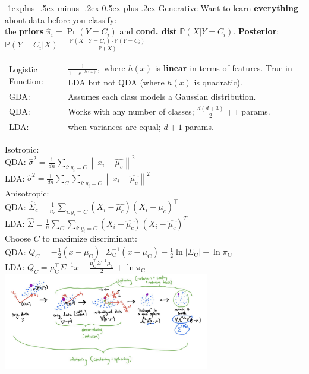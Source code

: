 \documentclass[10pt,landscape]{article}
\makeatletter
\renewcommand{\subsection}{\@startsection{subsection}{2}{0mm}%
                                {-1explus -.5ex minus -.2ex}%
                                {0.5ex plus .2ex}%
                                {\normalfont\normalsize\bfseries}}
\makeatother
\begin{document}
\begin{multicols}{3}
\subsection{Generative}
Want to learn \textbf{everything} about data before you classify: \\
the \textbf{priors} $\hat\pi_i=\Pr(Y=C_i)$ and \textbf{cond. dist} $\mathbb{P}(X|Y=C_i)$.
\textbf{Posterior}: $\mathbb{P}(Y=C_i | X) = \frac{\mathbb{P}(X \mid Y = C_i) \cdot \mathbb{P}(Y=C_i)}{\mathbb{P}(X)}$ 
\begin{tabular}{@{}p{\the\MyLen}%
                @{}p{\linewidth-\the\MyLen}@{}}
Logistic Function: & $\frac{1}{1 + e^{-h(x)}}, $ where $h(x)$ is \textbf{linear} in terms of features. True in LDA but not QDA (where $h(x)$ is quadratic).\\
GDA: & Assumes each class models a Gaussian distribution. \\
QDA:  &  Works with any number of classes; $\frac{d(d+3)}{2}+1$ params.\\
LDA:  &  when variances are equal; $d+1$ params.\\
\end{tabular}
Isotropic:\\
\quad QDA: $\widehat{\sigma }^2 = \frac{1}{dn} \sum_{i : y_i = C}^{} \left \| x_i - \widehat{\mu _c} \right \|^2$\\
\quad LDA: $\widehat{\sigma }^2 = \frac{1}{dn} \sum_{C}^{}\sum_{i : y_i = C}^{} \left \| x_i - \widehat{\mu _c} \right \|^2$\\

Anisotropic:\\
\quad QDA: $\widehat{\Sigma}_c = \frac{1}{n_c} \sum_{i : y_i = C}^{} (X_i - \widehat{\mu _c})(X_i - \widehat{\mu _c})^\top$\\
\quad LDA: $\widehat{\Sigma} = \frac{1}{n} \sum_{C}^{}\sum_{i : y_i = C}^{} (X_i - \widehat{\mu _c})(X_i - \widehat{\mu _c})^T$ \\ \vspace{8mm}
Choose $C$ to maximize discriminant: \\ QDA: $Q_C=-\frac{1}{2}\left(x-\mu_{\mathrm{C}}\right)^{\top} \Sigma_{\mathrm{C}}^{-1}\left(x-\mu_{\mathrm{C}}\right)-\frac{1}{2} \ln \left|\Sigma_{\mathrm{C}}\right|+\ln \pi_{\mathrm{C}}$ \\ LDA: $Q_C=\mu_{\mathrm{C}}^{\top} \Sigma^{-1} x-\frac{\mu_{\mathrm{C}}^{\top} \Sigma^{-1} \mu_{\mathrm{C}}}{2}+\ln \pi_{\mathrm{C}}$
\includegraphics[width=90mm]{whitening.png}

\end{multicols}
\end{document}
